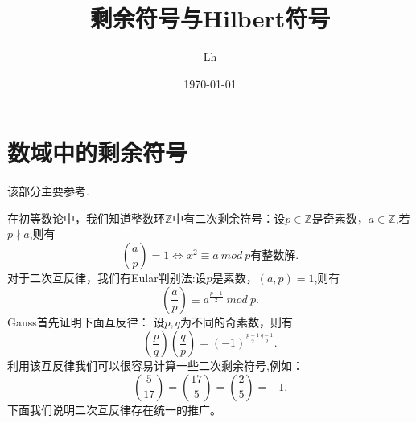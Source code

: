\documentclass[UTF8]{article}
\title{\textbf{\huge{剩余符号与Hilbert符号}}}
\author{Lh}
\date{\today}
\begin{document}
	\maketitle
	\tableofcontents
\section{数域中的剩余符号}
该部分主要参考\cite{lemmer}.

在初等数论中，我们知道整数环$\mathbb{Z}$中有二次剩余符号：设$p\in \mathbb{Z}$是奇素数，$a\in \mathbb{Z}$,若$p\nmid a$,则有
$$
\left(\frac{a}{p}\right)=1\Leftrightarrow x^{2}\equiv a\ mod \ p\text{有整数解.}
$$
对于二次互反律，我们有Eular判别法:设$p$是素数，$(a,p)=1$,则有
$$
\left(\frac{a}{p}\right)\equiv a^{\frac{p-1}{2}}\ mod \ p.
$$
Gauss首先证明下面互反律：
设$p,q$为不同的奇素数，则有
$$
\left(\frac{p}{q}\right)\left(\frac{q}{p}\right)=(-1)^{\frac{p-1}{2}\frac{q-1}{2}}.
$$
利用该互反律我们可以很容易计算一些二次剩余符号,例如：
$$
\left(\frac{5}{17}\right)=\left(\frac{17}{5}\right)=\left(\frac{2}{5}\right)=-1.
$$
下面我们说明二次互反律存在统一的推广。
\end{document}
